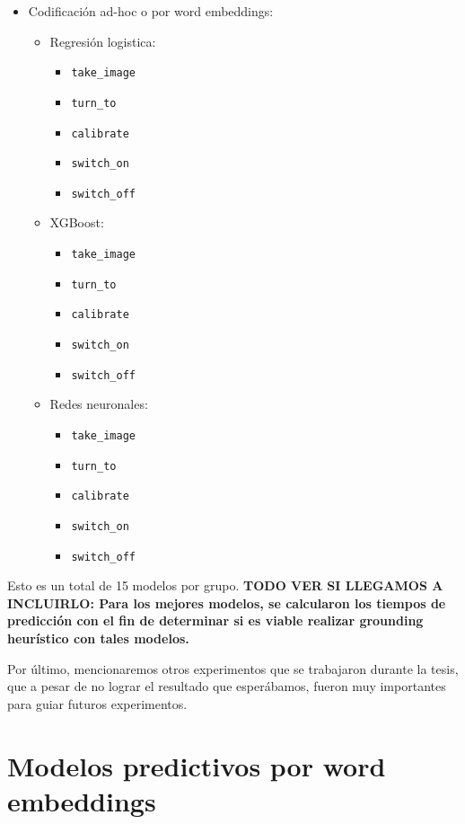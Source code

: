 \begin{itemize}
    \item Codificación ad-hoc o por word embeddings:
    \begin{itemize}
        \item Regresión logistica:
        \begin{itemize}
            \item \verb|take_image|
            \item \verb|turn_to|
            \item \verb|calibrate|
            \item \verb|switch_on|
            \item \verb|switch_off|
        \end{itemize}
        \item XGBoost:
        \begin{itemize}
            \item \verb|take_image|
            \item \verb|turn_to|
            \item \verb|calibrate|
            \item \verb|switch_on|
            \item \verb|switch_off|
        \end{itemize}
        \item Redes neuronales:
        \begin{itemize}
            \item \verb|take_image|
            \item \verb|turn_to|
            \item \verb|calibrate|
            \item \verb|switch_on|
            \item \verb|switch_off|
        \end{itemize}
    \end{itemize}
\end{itemize}

Esto es un total de 15 modelos por grupo. \textbf{TODO VER SI LLEGAMOS A
INCLUIRLO: Para los mejores modelos, se calcularon los tiempos de predicción con
el fin de determinar si es viable realizar grounding heurístico con tales modelos.} 

Por último, mencionaremos otros experimentos que se trabajaron durante la tesis,
que a pesar de no lograr el resultado que esperábamos, fueron muy importantes
para guiar futuros experimentos.

\section{Modelos predictivos por word embeddings}
\label{exp:ad-hoc}

